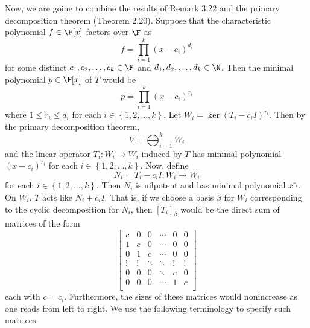 \documentclass[math_245.tex]{subfiles}
\begin{document}
    \begin{remark}
        Now, we are going to combine the results of Remark 3.22 and the primary decomposition theorem (Theorem 2.20). Suppose that the characteristic polynomial $f\in\F[x]$ factors over $\F$ as
        \begin{equation*}
            f = \prod^{k}_{i=1} \left( x-c_i \right) ^{d_i}
        \end{equation*}
        for some distinct $c_1,c_2,\ldots,c_k\in\F$ and $d_1,d_2,\ldots,d_k\in\N$. Then the minimal polynomial $p\in\F[x]$ of $T$ would be
        \begin{equation*}
            p = \prod^{k}_{i=1} \left( x-c_i \right) ^{r_i}
        \end{equation*}
        where $1\leq r_i\leq d_i$ for each $i\in\left\lbrace 1,2,\ldots,k \right\rbrace$. Let $W_i = \ker\left( T_i-c_iI \right)^{r_i}$. Then by the primary decomposition theorem,
        \begin{equation*}
            V = \bigoplus^{k}_{i=1} W_i
        \end{equation*}
        and the linear operator $T_i:W_i\to W_i$ induced by $T$ has minimal polynomial $\left( x-c_i \right) ^{r_i}$ for each $i\in\left\lbrace 1,2,\ldots,k \right\rbrace $. Now, define
        \begin{equation*}
            N_i = T_i-c_iI: W_i\to W_i
        \end{equation*}
        for each $i\in\left\lbrace 1,2,\ldots,k \right\rbrace$. Then $N_i$ is nilpotent and has minimal polynomial $x^{r_i}$. On $W_i$, $T$ acts like $N_i+c_iI$. That is, if we choose a basis $\beta$ for $W_i$ corresponding to the cyclic decomposition for $N_i$, then $\left[ T_i \right] _\beta$ would be the direct sum of matrices of the form
        \begin{equation*}
            \begin{bmatrix}
                c & 0 & 0 & \cdots & 0 & 0 \\
                1 & c & 0 & \cdots & 0 & 0 \\
                0 & 1 & c & \cdots & 0 & 0 \\
                \vdots & \vdots & \ddots & \ddots & \vdots & \vdots \\
                0 & 0 & 0 & \ddots & c & 0 \\
                0 & 0 & 0 & \cdots & 1 & c \\
            \end{bmatrix}
        \end{equation*}
        each with $c=c_i$. Furthermore, the sizes of these matrices would nonincrease as one reads from left to right. We use the following terminology to specify such matrices. 
    \end{remark}
\end{document}

